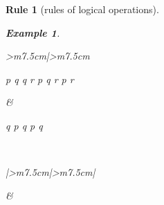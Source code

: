 \documentclass[10pt,a4paper]{book}
\newtheorem{example}{Example}[section]
\newtheorem{Rule}{Rule}[section]
\begin{document}
\begin{Rule}[rules of logical operations]
\begin{example}
    \end{example}

    \begin{tabular}{>{\centering\arraybackslash}m{7.5cm}|>{\centering\arraybackslash}m{7.5cm}}

        \begin{fitchproof}[arrayenv=tabular]
            \have {} {p \to q}  {}
            \have {} {q \to r}  {}
            \open
            \have {} {p}  {}
            \have {} {q}  {}
            \have {} {r}  {}
            \close
            \have {} {p \to r}  {}

        \end{fitchproof}
        \rule[0pt]{0pt}{0pt} &
        \begin{fitchproof}[arrayenv=tabular]
            \have {} {q }  {}
            \open
            \have {} {p}  {}
            \have {} {q}  {}
            \close
            \have {} {p \to q}  {}

        \end{fitchproof}
        \rule[0pt]{0pt}{0pt}   \\
    \end{tabular}

    \begin{tabular}{|>{\centering\arraybackslash}m{7.5cm}|>{\centering\arraybackslash}m{7.5cm}|}
        \hline
        \begin{fitchproof}[arrayenv=tabular]
             {\varphi}
             {\psi}
             {\therefore \varphi \land \psi} 
        \end{fitchproof}
        \rule[0pt]{0pt}{0pt} &
        \begin{minipage}[t]{\linewidth}
            \centering
            \begin{minipage}[t]{0.48\linewidth}
                \begin{fitchproof}[arrayenv=tabular]
                     {\varphi \land \psi}
                     {\therefore \varphi}  
                \end{fitchproof}
            \end{minipage}
            \begin{minipage}[t]{0.48\linewidth}
                \begin{fitchproof}[arrayenv=tabular]
                     {\varphi \land \psi}
                     {\therefore\psi} 
                \end{fitchproof}
            \end{minipage}
        \end{minipage}
        \rule[0pt]{0pt}{0pt}   \\
        \hline
    \end{tabular}


\end{Rule}
\end{document}
